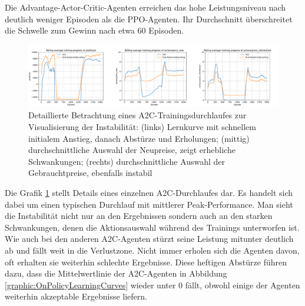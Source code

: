Die Advantage-Actor-Critic-Agenten erreichen das hohe Leistungsniveau nach deutlich weniger Episoden als die PPO-Agenten.
Ihr Durchschnitt überschreitet die Schwelle zum Gewinn nach etwa 60 Episoden.
\begin{figure}[htb]
	\centering
	\includegraphics[width=\textwidth]{main/a2c_detailed_analysis.pdf}
	\caption{
		Detaillierte Betrachtung eines A2C-Trainingsdurchlaufes zur Visualisierung der Instabilität:
		(links) Lernkurve mit schnellem initialem Anstieg, danach Abstürze und Erholungen;
		(mittig) durchschnittliche Auswahl der Neupreise, zeigt erhebliche Schwankungen;
		(rechts) durchschnittliche Auswahl der Gebrauchtpreise, ebenfalls instabil
	}
	\label{graphic:A2CInstability}
\end{figure}
Die Grafik \ref{graphic:A2CInstability} stellt Details eines einzelnen A2C-Durchlaufes dar.
Es handelt sich dabei um einen typischen Durchlauf mit mittlerer Peak-Performance.
Man sieht die Instabilität nicht nur an den Ergebnissen sondern auch an den starken Schwankungen, denen die Aktionsauswahl während des Trainings unterworfen ist.
Wie auch bei den anderen A2C-Agenten stürzt seine Leistung mitunter deutlich ab und fällt weit in die Verlustzone.
Nicht immer erholen sich die Agenten davon, oft erhalten sie weiterhin schlechte Ergebnisse.
Diese heftigen Abstürze führen dazu, dass die Mittelwertlinie der A2C-Agenten in Abbildung \ref{graphic:OnPolicyLearningCurves} wieder unter 0 fällt, obwohl einige der Agenten weiterhin akzeptable Ergebnisse liefern.

